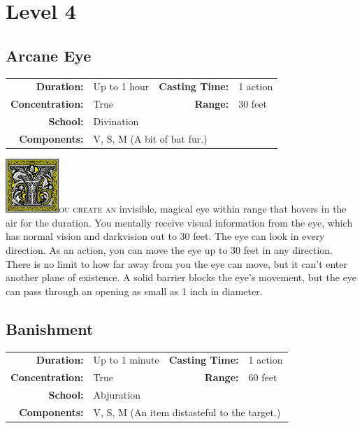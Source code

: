 \documentclass[12pt,showtrims]{memoir}
\begin{document}
\newpage
\chapter*{Level 4} 
\section*{Arcane Eye}

{
\small\centering\vspace{-6pt}
\begin{tabular}{rlrl}
\toprule

\textbf{Duration:} & Up to 1 hour &
\textbf{Casting Time:} & 1 action \\
\textbf{Concentration:} & True &
\textbf{Range:} & 30 feet \\
\textbf{School:} & Divination \\
\textbf{Components:} & \multicolumn{3}{p{0.7\textwidth}}{V, S, M (A bit of bat fur.)}\\

\bottomrule
\end{tabular}
}

\vspace{1\baselineskip}\noindent 
\lettrine[lines=4]{\includegraphics[height=58pt]{initials/Y.png}}{ou create an} invisible, magical eye within range that hovers in the air for the duration. You mentally receive visual information from the eye, which has normal vision and darkvision out to 30 feet. The eye can look in every direction. As an action, you can move the eye up to 30 feet in any direction. There is no limit to how far away from you the eye can move, but it can't enter another plane of existence. A solid barrier blocks the eye's movement, but the eye can pass through an opening as small as 1 inch in diameter.

\newpage
\section*{Banishment}

{
\small\centering\vspace{-6pt}
\begin{tabular}{rlrl}
\toprule

\textbf{Duration:} & Up to 1 minute &
\textbf{Casting Time:} & 1 action \\
\textbf{Concentration:} & True &
\textbf{Range:} & 60 feet \\
\textbf{School:} & Abjuration \\
\textbf{Components:} & \multicolumn{3}{p{0.7\textwidth}}{V, S, M (An item distasteful to the target.)}\\

\bottomrule
\end{tabular}
}
\end{document}
